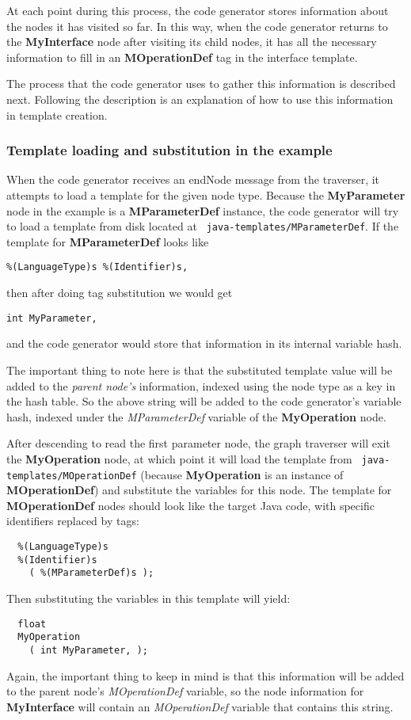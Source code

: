 At each point during this process, the code generator stores information about
the nodes it has visited so far. In this way, when the code generator returns to
the {\bf MyInterface} node after visiting its child nodes, it has all the
necessary information to fill in an {\bf MOperationDef} tag in the interface
template.

The process that the code generator uses to gather this information is described
next. Following the description is an explanation of how to use this information
in template creation.

\subsubsection{Template loading and substitution in the example}

When the code generator receives an endNode message from the traverser, it
attempts to load a template for the given node type. Because the {\bf
MyParameter} node in the example is a {\bf MParameterDef} instance, the code
generator will try to load a template from disk located at {\tt
java-templates/MParameterDef}. If the template for {\bf MParameterDef} looks
like
\begin{verbatim}
%(LanguageType)s %(Identifier)s,
\end{verbatim}
then after doing tag substitution we would get
\begin{verbatim}
int MyParameter,
\end{verbatim}
and the code generator would store that information in its internal variable
hash.

The important thing to note here is that the substituted template value will be
added to the {\em parent node's\/} information, indexed using the node type as a
key in the hash table. So the above string will be added to the code generator's
variable hash, indexed under the {\it MParameterDef\/} variable of the {\bf
MyOperation} node.

After descending to read the first parameter node, the graph traverser will exit
the {\bf MyOperation} node, at which point it will load the template from {\tt
java-templates/MOperationDef} (because {\bf MyOperation} is an instance of {\bf
MOperationDef}) and substitute the variables for this node. The template for
{\bf MOperationDef} nodes should look like the target Java code, with specific
identifiers replaced by tags:
\begin{verbatim}
  %(LanguageType)s
  %(Identifier)s
    ( %(MParameterDef)s );
\end{verbatim}
Then substituting the variables in this template will yield:
\begin{verbatim}
  float
  MyOperation
    ( int MyParameter, );
\end{verbatim}
Again, the important thing to keep in mind is that this information will be
added to the parent node's {\it MOperationDef\/} variable, so the node
information for {\bf MyInterface} will contain an {\it MOperationDef\/} variable
that contains this string.

